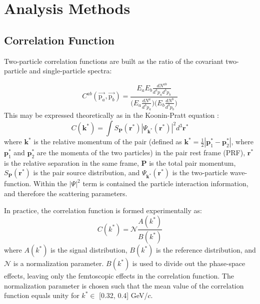 \documentclass[ALICE,manyauthors]{cernphprep}
\newcommand{\kstar}{$k^{*}$\xspace}
\begin{document}
\section{Analysis Methods}
\label{sec:AnalysisMethods}

\subsection{Correlation Function}
\label{sec:CorrelationFunction}
Two-particle correlation functions are built as the ratio of the covariant two-particle and single-particle spectra:

\begin{equation}
  C^{ab}(\vec{\mathrm{p}_{a}},\vec{\mathrm{p}_{b}}) = \frac{E_{a}E_{b}\frac{dN^{ab}}{d^{3}p_{a}d^{3}p_{b}}}{\big( E_{a}\frac{dN^{a}}{d^{3}p_{a}} \big) \big( E_{b}\frac{dN^{b}}{d^{3}p_{b}} \big)}
\label{eqn:CfRatioSpectra}
\end{equation}
This may be expressed theoretically as in the Koonin-Pratt equation \cite{Koonin:1977fh, Pratt:1990zq}:
\begin{equation}
 C(\mathbf{k^{*}}) = \int S_{\mathbf{P}}(\mathbf{r^{*}})|\Psi_{\mathbf{k^{*}}}(\mathbf{r^{*}})|^{2}d^{3}\mathbf{r^{*}}
\label{eqn:KooninPrattEqn}
\end{equation}
where $\mathbf{k}^{*}$ is the relative momentum of the pair (defined as $\mathbf{k}^{*} = \frac{1}{2}|\mathbf{p}_{1}^{*}-\mathbf{p}_{2}^{*}|$, where $\mathbf{p}_{1}^{*}$ and $\mathbf{p}_{2}^{*}$ are the momenta of the two particles) in the pair rest frame (PRF), $\mathbf{r}^{*}$ is the relative separation in the same frame, $\mathbf{P}$ is the total pair momentum, $S_{\mathbf{P}}(\mathbf{r^{*}})$ is the pair source distribution, and $\Psi_{\mathbf{k^{*}}}(\mathbf{r^{*}})$ is the two-particle wave-function.
Within the $|\Psi|^{2}$ term is contained the particle interaction information, and therefore the scattering parameters.

In practice, the correlation function is formed experimentally as:
\begin{equation}
  C(k^{*}) = \mathcal{N}\frac{A(k^{*})}{B(k^{*})}
\label{eqn:CfExp}
\end{equation}
where $A(k^{*})$ is the signal distribution, $B(k^{*})$ is the reference distribution, and $\mathcal{N}$ is a normalization parameter.  
$B(k^{*})$ is used to divide out the phase-space effects, leaving only the femtoscopic effects in the correlation function. 
The normalization parameter is chosen such that the mean value of the correlation function equals unity for \kstar $\in$ [0.32, 0.4] GeV/$c$.
\end{document}
